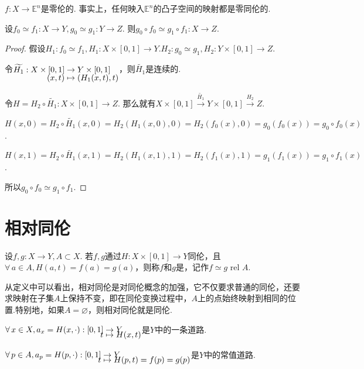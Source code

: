 \begin{instance}
    $f:X\to \mathbb{E}^n$是零伦的. 事实上，任何映入$\mathbb{E}^n$的凸子空间的映射都是零同伦的.
\end{instance}

\begin{proposition}[][prop:10.2]
    设$f_0\simeq f_1:X\to Y, g_0\simeq g_1:Y\to Z$.
    则$g_0\circ f_0 \simeq g_1\circ f_1:X\to Z$.
\end{proposition}

\begin{proof}
    假设$H_1:f_0\simeq f_1, H_1:X\times [0,1]\to Y$.$H_2:g_0\simeq g_1, H_2:Y\times [0,1]\to Z$.\par
    令$\setjot[-2]\begin{aligned}[t]
        \widetilde{H_1}:X\times [0,1]&\to Y\times [0,1] \\
        (x,t)&\mapsto (H_1(x,t),t)
    \end{aligned}$，则$\widetilde{H_1}$是连续的.\par
    令$H=H_2\circ \widetilde{H_1}:X\times [0,1]\to Z$.
    那么就有$X\times [0,1] \xrightarrow{\widetilde{H_1}} Y\times [0,1] \xrightarrow{H_2} Z$.\par
    $H(x,0)=H_2\circ\widetilde{H_1}(x,0)=H_2(H_1(x,0),0)=H_2(f_0(x),0)=g_0(f_0(x))=g_0\circ f_0(x)$.\par
    $H(x,1)=H_2\circ\widetilde{H_1}(x,1)=H_2(H_1(x,1),1)=H_2(f_1(x),1)=g_1(f_1(x))=g_1\circ f_1(x)$.\par
    所以$g_0\circ f_0 \simeq g_1\circ f_1$.
\end{proof}

\section{相对同伦}

\begin{definition}[相对同伦][def:10.3]
    设$f,g:X\to Y, A\subset X$. 若$f,g$通过$H:X\times [0,1]\to Y$同伦，且$\forall\, a\in A, H(a,t)=f(a)=g(a)$，则称$f$和$g$是，记作$f\simeq g \text{ rel } A$.
\end{definition}
从定义中可以看出，相对同伦是对同伦概念的加强，它不仅要求普通的同伦，还要求映射在子集$A$上保持不变，即在同伦变换过程中，$A$上的点始终映射到相同的位置.特别地，如果$A=\varnothing$，则相对同伦就是同伦.\par

\begin{remark}
    $\forall\,x\in X, a_x=\setjot[-6]\begin{aligned}[t]
        H(x,\cdot):[0,1] &\to Y \\
        t &\mapsto H(x,t)
    \end{aligned}$是$Y$中的一条道路.\par
    $\forall\,p\in A, a_p=\setjot[-6]\begin{aligned}[t]
        H(p,\cdot):[0,1] &\to Y \\
        t &\mapsto H(p,t)=f(p)=g(p)
    \end{aligned}$是$Y$中的常值道路.
\end{remark}

